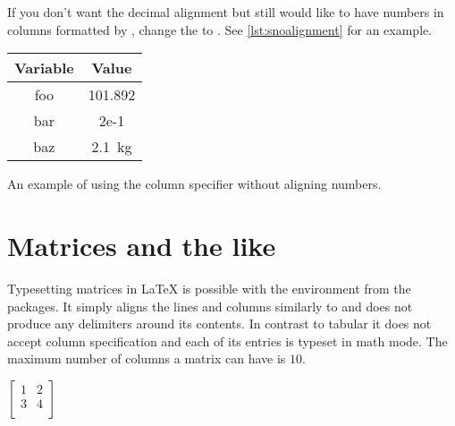 If you don't want the decimal alignment but still would like to have
numbers in columns formatted by , change the
 to . See \autoref{lst:snoalignment}
for an example.
\begin{listing}
  \begin{example}
\begin{tabular}{@{}cS@{}}
  \toprule
  Variable & {Value} \\
  \midrule
  foo & 101.892 \\
  bar & 2e-1 \\
  baz & \qty{2.1}{\kg}  \\
  \bottomrule
\end{tabular}
\end{example}
  \caption{An example of using the  column specifier without aligning
    numbers.}\label{lst:snoalignment}
\end{listing}

\section{Matrices and the like}\label{sec:arraymat}

Typesetting matrices in \LaTeX{} is possible with the 
environment from the  packages. It simply aligns the lines and
columns similarly to  and does not produce any delimiters around
its contents. In contrast to tabular it does not accept column specification
and each of its entries is typeset in math mode. The maximum number of columns
a matrix can have is \(10\).
\begin{example}
\( \left[
  \begin{matrix}
  1 & 2 \\
  3 & 4 \\
  \end{matrix}
  \right] \)
\end{example}

